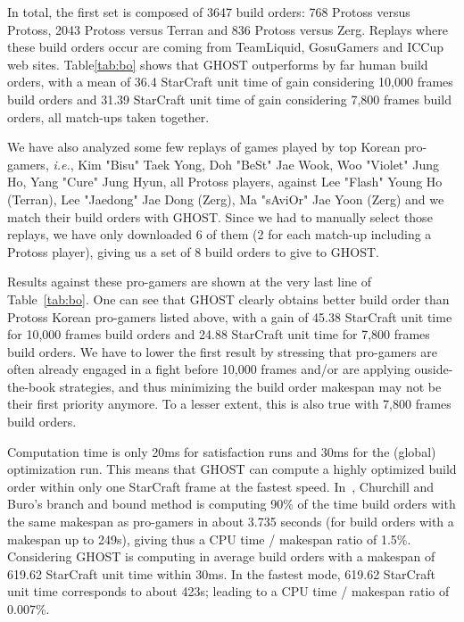\documentclass{article}
\newcommand{\ghost}{\textsc{GHOST}\xspace}
\newcommand{\ie}{\textit{i.e.}}
\begin{document}
In total, the first set is  composed of 3647 build orders: 768 Protoss
versus  Protoss, 2043  Protoss versus  Terran and  836 Protoss  versus
Zerg.   Replays  where  these  build  orders  occur  are  coming  from
TeamLiquid, GosuGamers  and ICCup  web sites.  Table\ref{tab:bo} shows
that \ghost outperforms by far human build orders, with a mean of 36.4
StarCraft unit time of gain considering 10,000 frames build orders and
31.39  StarCraft unit  time  of gain  considering  7,800 frames  build
orders, all match-ups taken together.

We have also  analyzed some few replays of games  played by top Korean
pro-gamers,  \ie, Kim  "Bisu"  Taek  Yong, Doh  "BeSt"  Jae Wook,  Woo
"Violet" Jung Ho, Yang "Cure"  Jung Hyun, all Protoss players, against
Lee  "Flash" Young  Ho (Terran),  Lee  "Jaedong" Jae  Dong (Zerg),  Ma
"sAviOr" Jae Yoon (Zerg) and we  match their build orders with \ghost.
Since we had to manually select those replays, we have only downloaded
6 of them (2 for each  match-up including a Protoss player), giving us
a set of 8 build orders to give to \ghost.

Results against  these pro-gamers are shown  at the very last  line of
Table~\ref{tab:bo}.  One  can see  that \ghost clearly  obtains better
build order than  Protoss Korean pro-gamers listed above,  with a gain
of 45.38 StarCraft unit time for  10,000 frames build orders and 24.88
StarCraft unit  time for 7,800 frames  build orders. We have  to lower
the  first  result by  stressing  that  pro-gamers are  often  already
engaged  in  a   fight  before  10,000  frames   and/or  are  applying
ouside-the-book  strategies,  and  thus  minimizing  the  build  order
makespan may not be their first  priority anymore. To a lesser extent,
this is also true with 7,800 frames build orders.

Computation time is  only 20ms for satisfaction runs and  30ms for the
(global) optimization run. This means that \ghost can compute a highly
optimized build order  within only one StarCraft frame  at the fastest
speed. In~\cite{ChurchillB11},  Churchill and Buro's branch  and bound
method  is computing  90\%  of the  time build  orders  with the  same
makespan as pro-gamers in about 3.735 seconds (for build orders with a
makespan  up to  249s), giving  thus a  CPU time  / makespan  ratio of
1.5\%. Considering \ghost is computing  in average build orders with a
makespan of  619.62 StarCraft  unit time within  30ms. In  the fastest
mode, 619.62 StarCraft unit time corresponds to about 423s; leading to
a CPU time / makespan ratio of 0.007\%.
\end{document}
